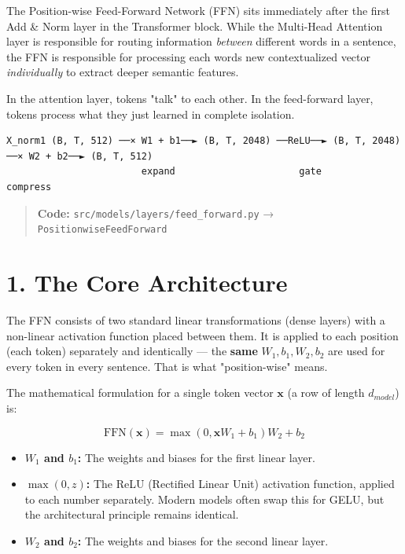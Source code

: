 \documentclass[11pt,a4paper,oneside]{report}
\providecommand{\tightlist}{\setlength{\itemsep}{0pt}\setlength{\parskip}{0pt}}
\begin{document}
The Position-wise Feed-Forward Network (FFN) sits immediately after the first Add \& Norm layer in the Transformer block. While the Multi-Head Attention layer is responsible for routing information \emph{between} different words in a sentence, the FFN is responsible for processing each word\textquotesingle s new contextualized vector \emph{individually} to extract deeper semantic features.

In the attention layer, tokens "talk" to each other. In the feed-forward layer, tokens process what they just learned in complete isolation.

\begin{Verbatim}[fontsize=\footnotesize]
X_norm1 (B, T, 512) ──× W1 + b1──► (B, T, 2048) ──ReLU──► (B, T, 2048) ──× W2 + b2──► (B, T, 512)
                        expand                      gate                    compress
\end{Verbatim}

\begin{quote}
\textbf{Code:} \texttt{src/\allowbreak{}models/\allowbreak{}layers/\allowbreak{}feed\_\allowbreak{}forward.\allowbreak{}py} → \texttt{PositionwiseFeedForward}
\end{quote}

\section{1. The Core Architecture}\label{1-the-core-architecture}

The FFN consists of two standard linear transformations (dense layers) with a non-linear activation function placed between them. It is applied to each position (each token) separately and identically --- the \textbf{same} \(W_1, b_1, W_2, b_2\) are used for every token in every sentence. That is what "position-wise" means.

The mathematical formulation for a single token vector \(\mathbf{x}\) (a row of length \(d_{model}\)) is:

\[\text{FFN}(\mathbf{x}) = \max(0, \mathbf{x}W_1 + b_1)W_2 + b_2\]

\begin{itemize}
\tightlist
\item
  \textbf{\(W_1\) and \(b_1\):} The weights and biases for the first linear layer.
\item
  \textbf{\(\max(0, z)\):} The ReLU (Rectified Linear Unit) activation function, applied to each number separately. Modern models often swap this for GELU, but the architectural principle remains identical.
\item
  \textbf{\(W_2\) and \(b_2\):} The weights and biases for the second linear layer.
\end{itemize}
\end{document}
